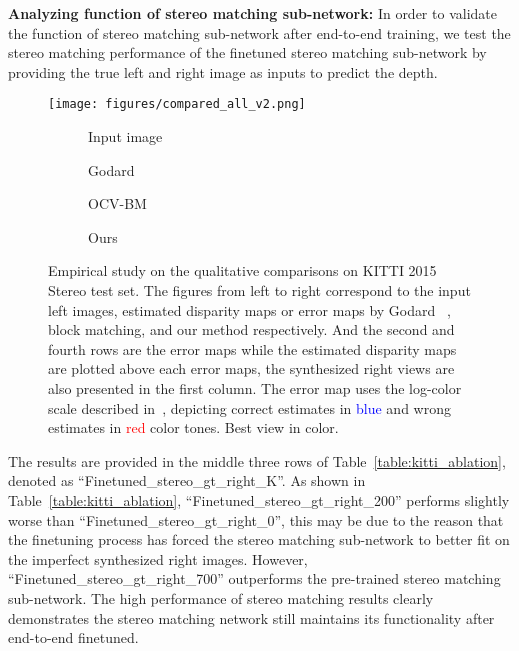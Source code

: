 \documentclass[10pt,twocolumn,letterpaper]{article}
\begin{document}
\textbf{Analyzing function of stereo matching sub-network:}
In order to validate the function of stereo matching sub-network after end-to-end training, we test the stereo matching performance of the finetuned stereo matching sub-network by providing the true left and right image as inputs to predict the depth. 


\begin{figure*}[t!]
\centering
	\texttt{[image: figures/compared\_all\_v2.png]}
    \begin{subfigure}[b]{0.24\linewidth}
    \caption{Input image}
  	\end{subfigure}	
	\begin{subfigure}[b]{0.24\linewidth}
    \caption{Godard \etal~\cite{godard2016unsupervised}}
  	\end{subfigure}
  	\begin{subfigure}[b]{0.24\linewidth}
    \caption{OCV-BM}
  	\end{subfigure}
  	\begin{subfigure}[b]{0.24\linewidth}
    \caption{Ours}
  	\end{subfigure}
  	\vspace{-14pt}
	\caption{Empirical study on the qualitative comparisons on KITTI 2015 Stereo test set. The figures from left to right correspond to the input left images, estimated disparity maps or error maps by Godard \etal ~\cite{godard2016unsupervised}, block matching, and our method respectively. And the second and fourth rows are the error maps while the estimated disparity maps are plotted above each error maps, the synthesized right views are also presented in the first column. The error map uses the log-color scale described in~\cite{Menze2015CVPR}, depicting correct estimates in \textcolor{blue}{blue} and wrong estimates in \textcolor{red}{red} color tones. Best view in color.}
	\label{fig:stereo-comparison}
	\vspace{-12pt}
\end{figure*}

The results are provided in the middle three rows of Table~\ref{table:kitti_ablation}, denoted as ``Finetuned\_stereo\_gt\_right\_K''. As shown in Table~\ref{table:kitti_ablation}, ``Finetuned\_stereo\_gt\_right\_200'' performs slightly worse than ``Finetuned\_stereo\_gt\_right\_0'', this may be due to the reason that the finetuning process has forced the stereo matching sub-network to better fit on the imperfect synthesized right images. However, ``Finetuned\_stereo\_gt\_right\_700'' outperforms the pre-trained stereo matching sub-network. The high performance of stereo matching results clearly demonstrates the stereo matching network still maintains its functionality after end-to-end finetuned. 
\end{document}
